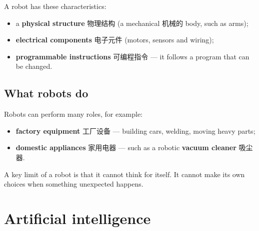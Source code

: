 \documentclass[11pt]{article}
\begin{document}
A robot has these characteristics:

\begin{itemize}
\item a \textbf{physical structure} 物理结构 (a mechanical 机械的 body, such as arms);

\item \textbf{electrical components} 电子元件 (motors, sensors and wiring);

\item \textbf{programmable instructions} 可编程指令 — it follows a program that can be changed.

\end{itemize}

\subsection*{What robots do}

Robots can perform many roles, for example:

\begin{itemize}
\item \textbf{factory equipment} 工厂设备 — building cars, welding, moving heavy parts;

\item \textbf{domestic appliances} 家用电器 — such as a robotic \textbf{vacuum cleaner} 吸尘器.

\end{itemize}

\begin{center}
\end{center}

A key limit of a robot is that it cannot think for itself. It cannot make its own choices when something unexpected happens.

\section*{Artificial intelligence}
\end{document}
